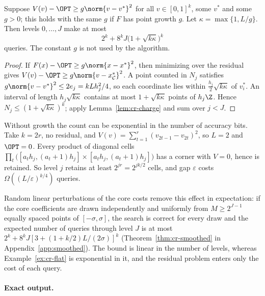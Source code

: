 \begin{proposition}\label{prop:cr-growth}
Suppose $V(v)-\OPT\ge g\norm{v-v^*}^2$ for all $v\in[0,1]^k$, some $v^*$
and some $g>0$; this holds with the same $g$ if $F$ has point growth $g$.
Let $\kappa=\max\{1,L/g\}$. Then levels $0,\ldots,J$ make at most
\[
2^k+8^kJ\bigl(1+\sqrt{k\kappa}\bigr)^k
\]
queries. The constant $g$ is not used by the algorithm.
\end{proposition}
\begin{proof}
If $F(x)-\OPT\ge g\norm{x-x^*}^2$, then minimizing over the residual gives
$V(v)-\OPT\ge g\norm{v-x^*_{\mathcal C}}^2$. A point counted in $N_j$
satisfies $g\norm{v-v^*}^2\le2e_j=kLh_j^2/4$, so each coordinate lies
within $\frac{h_j}2\sqrt{k\kappa}$ of $v^*_i$. An interval of length
$h_j\sqrt{k\kappa}$ contains at most $1+\sqrt{k\kappa}$ points of
$h_j\Z$. Hence $N_j\le(1+\sqrt{k\kappa})^k$; apply
Lemma~\ref{lem:cr-charge} and sum over $j<J$.
\end{proof}

\begin{example}\label{ex:cr-flat}
Without growth the count can be exponential in the number of accuracy
bits. Take $k=2r$, no residual, and $V(v)=\sum_{t=1}^r(v_{2t-1}-v_{2t})^2$,
so $L=2$ and $\OPT=0$. Every product of diagonal cells
$\prod_t\bigl([a_th_j,(a_t+1)h_j]\times[a_th_j,(a_t+1)h_j]\bigr)$ has a
corner with $V=0$, hence is retained. So level $j$ retains at least
$2^{jr}=2^{jk/2}$ cells, and gap $\varepsilon$ costs
$\Omega((L/\varepsilon)^{k/4})$ queries.
\end{example}

Random linear perturbations of the core costs remove this effect in
expectation: if the core coefficients are drawn independently and uniformly
from $M\ge2^{J-1}$ equally spaced points of $[-\sigma,\sigma]$, the search is
correct for every draw and the expected number of queries through level $J$
is at most $2^k+8^kJ[3+(1+k/2)L/(2\sigma)]^k$ (Theorem~\ref{thm:cr-smoothed}
in Appendix~\ref{app:smoothed}). The bound is linear in the number of levels,
whereas Example~\ref{ex:cr-flat} is exponential in it, and the residual
problem enters only the cost of each query.

\paragraph{Exact output.}\label{sec:cr-exact}

